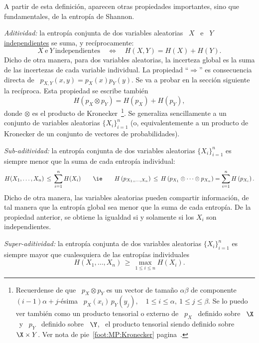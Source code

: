 A partir de esta definici\'on,  aparecen otras propiedades importantes, sino que
fundamentales, de la entrop\'ia de Shannon.
%
\begin{propiedades}
\item\label{Prop:SZ:aditividad} {\it Aditividad:}  la entrop\'ia conjunta de dos
  variables aleatorias  \ $X$  \ e \  $Y$ \underline{independientes} se  suma, y
  rec\'iprocamente:
  \[
  X \: \mbox{e} \: Y \: \mbox{independientes} \quad \Leftrightarrow \quad H(X,Y)
  =  H(X) +  H(Y).
  \]
  Dicho de otra manera, para dos variables aleatorias, la incerteza global es la
  suma   de  las  incertezas   de  cada   variable  individual.    La  propiedad
  ``$\Rightarrow$'' es consecuencia directa de \ $p_{X,Y}(x,y) = p_X(x) p_Y(y)$.
  Se va  a probar en  la secci\'on siguiente  la rec\'iproca. Esta  propiedad se
  escribe tambi\'en
  \[
  H\left( p_X \otimes p_Y \right) = H\left( p_X \right) + H\left( p_Y \right),
  \]
  donde  $\otimes$ es el  producto de  Kronecker~\footnote{Recuerdense de  que \
    $p_X  \otimes p_Y$ es  un vector  de tama\~no  $\alpha \beta$  de componente
    $(i-1)  \alpha +  j$-\'esima \  $p_X(x_i)  \, p_Y(y_j),  \quad 1  \le i  \le
    \alpha, \: 1 \le  j \le \beta$.  Se lo puedo ver  tambi\'en como un producto
    tensorial  o externo  de \  $p_X$ \  definido sobre  \ $\X$  \ y  \  $p_Y$ \
    definido sobre \  $\Y$, \ el producto tensorial siendo  definido sobre \ $\X
    \times      Y$.       Ver      nota      de      pie~\ref{foot:MP:Kronecker}
    pagina~\pageref{foot:MP:Kronecker}.}.   Se  generaliza  sencillamente  a  un
  conjunto de variables aleatorias $\{ X_i \}_{i=1}^n$ (o, equivalentemente a un
  producto de Kronecker de un conjunto de vectores de probabilidades).
%
\item\label{Prop:SZ:subaditividad} {\it  Sub-aditividad:} la entrop\'ia conjunta
  de dos variables  aleatorias $\{ X_i \}_{i=1}^n$ es siempre  menor que la suma
  de cada entrop\'ia individual:
  \[
  H(X_1,\ldots,X_n)  \,  \le \,  \sum_{i=1}^n  H(X_i)  \qquad \mbox{\ie}  \qquad
  H\left(  p_{X_1,, \ldots  , X_n}  \right) \,  \le \,  H\left(  p_{X_1} \otimes
    \cdots \otimes p_{X_n} \right) = \sum_{i=1}^n H\left( p_{X_i} \right).
  \]
  Dicho de otra manera, las variables aleatorias pueden compartir informaci\'on,
  de  tal  manera que  la  entrop\'ia  global sea  menor  que  la  suma de  cada
  entrop\'ia.  De la  propiedad anterior, se obtiene la  igualdad si y solamente
  si los $X_i$ son independientes.
%
\item\label{Prop:SZ:superaditividad}   {\it  Super-aditividad:}   la  entrop\'ia
  conjunta de dos variables aleatorias  $\{ X_i \}_{i=1}^n$ es siempre mayor que
  cualesquiera de las entrop\'ias individuales
  \[
  H(X_1,\ldots,X_n) \, \ge \, \max_{1 \le i \le n} H(X_i).
  \]
\end{propiedades}

